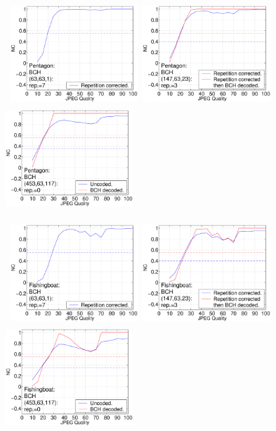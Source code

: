 \documentclass[12pt]{report}
\begin{document}
\begin{figure}[p]
\setlength{\abovecaptionskip}{-0.25cm}
\centerline{ \hbox{
\includegraphics[height=3.81cm,width=4.8cm]{EPS_BK_formattedBetter/ml63pent63.eps}
\includegraphics[height=3.81cm,width=4.8cm]{EPS_BK_formattedBetter/ml63pent147.eps}
\includegraphics[height=3.81cm,width=4.8cm]{EPS_BK_formattedBetter/ml63pent453.eps}
}}
 
\centerline{ \hbox{
\includegraphics[height=3.81cm,width=4.8cm]{EPS_BK_formattedBetter/ml63fish63.eps}
\includegraphics[height=3.81cm,width=4.8cm]{EPS_BK_formattedBetter/ml63fish147.eps}
\includegraphics[height=3.81cm,width=4.8cm]{EPS_BK_formattedBetter/ml63fish453.eps}
}}
 

\end{figure}
\end{document}
